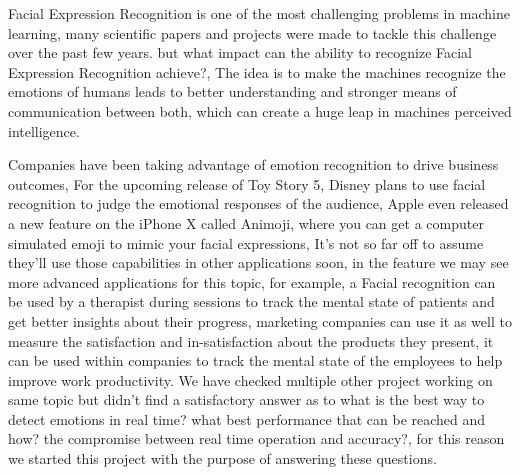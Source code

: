 Facial Expression Recognition is one of the most challenging problems in machine learning, many scientific papers and projects were made to tackle this challenge over the past few years.\newline
but what impact can the ability to recognize Facial Expression Recognition achieve?, The idea is to make the machines recognize the emotions of humans leads to better understanding and stronger means of communication between both, which can create a huge leap in machines perceived intelligence.
\bigbreak

Companies have been taking advantage of emotion recognition to drive business outcomes, For the upcoming release of Toy Story 5, Disney plans to use facial recognition to judge the emotional responses of the audience, Apple even released a new feature on the iPhone X called Animoji, where you can get a computer simulated emoji to mimic your facial expressions, It’s not so far off to assume they’ll use those capabilities in other applications soon, in the feature we may see more advanced applications for this topic, for example, a Facial recognition can be used by a therapist during sessions to track the mental state of patients and get better insights about their progress, marketing companies can use it as well to measure the satisfaction and in-satisfaction about the products they present, it can be used within companies to track the mental state of the employees to help improve work productivity.
\bigbreak
We have checked multiple other project working on same topic but didn't find a satisfactory answer as to what is the best way to detect emotions in real time? what best performance that can be reached and how? the compromise between real time operation and accuracy?, for this reason we started this project with the purpose of answering these questions.

